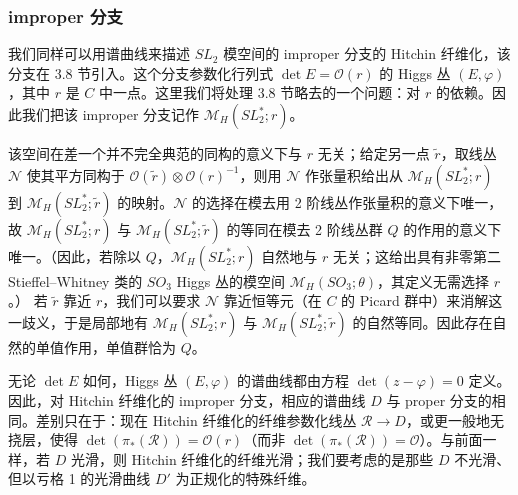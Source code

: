 \documentclass[11pt,a4paper]{article}
\begin{document}
\subsubsection{improper 分支}

我们同样可以用谱曲线来描述 $SL_2$ 模空间的 improper 分支的 Hitchin 纤维化，该分支在 3.8 节引入。这个分支参数化行列式 $\det E = \mathcal{O}(r)$ 的 Higgs 丛 $(E,\varphi)$，其中 $r$ 是 $C$ 中一点。这里我们将处理 3.8 节略去的一个问题：对 $r$ 的依赖。因此我们把该 improper 分支记作 $\mathcal{M}_H(SL_2^*;r)$。

该空间在差一个并不完全典范的同构的意义下与 $r$ 无关；给定另一点 $\tilde{r}$，取线丛 $\mathcal{N}$ 使其平方同构于 $\mathcal{O}(\tilde{r})\otimes\mathcal{O}(r)^{-1}$，则用 $\mathcal{N}$ 作张量积给出从 $\mathcal{M}_H(SL_2^*;r)$ 到 $\mathcal{M}_H(SL_2^*;\tilde{r})$ 的映射。$\mathcal{N}$ 的选择在模去用 2 阶线丛作张量积的意义下唯一，故 $\mathcal{M}_H(SL_2^*;r)$ 与 $\mathcal{M}_H(SL_2^*;\tilde{r})$ 的等同在模去 2 阶线丛群 $Q$ 的作用的意义下唯一。（因此，若除以 $Q$，$\mathcal{M}_H(SL_2^*;r)$ 自然地与 $r$ 无关；这给出具有非零第二 Stieffel--Whitney 类的 $SO_3$ Higgs 丛的模空间 $\mathcal{M}_H(SO_3;\theta)$，其定义无需选择 $r$。）
若 $\tilde{r}$ 靠近 $r$，我们可以要求 $\mathcal{N}$ 靠近恒等元（在 $C$ 的 Picard 群中）来消解这一歧义，于是局部地有 $\mathcal{M}_H(SL_2^*;r)$ 与 $\mathcal{M}_H(SL_2^*;\tilde{r})$ 的自然等同。因此存在自然的单值作用，单值群恰为 $Q$。



无论 $\det E$ 如何，Higgs 丛 $(E,\varphi)$ 的谱曲线都由方程 $\det(z-\varphi) = 0$ 定义。因此，对 Hitchin 纤维化的 improper 分支，相应的谱曲线 $D$ 与 proper 分支的相同。差别只在于：现在 Hitchin 纤维化的纤维参数化线丛 $\mathcal{R}\to D$，或更一般地无挠层，使得 $\det(\pi_*(\mathcal{R})) = \mathcal{O}(r)$（而非 $\det(\pi_*(\mathcal{R})) = \mathcal{O}$）。与前面一样，若 $D$ 光滑，则 Hitchin 纤维化的纤维光滑；我们要考虑的是那些 $D$ 不光滑、但以亏格 1 的光滑曲线 $D'$ 为正规化的特殊纤维。
\end{document}
